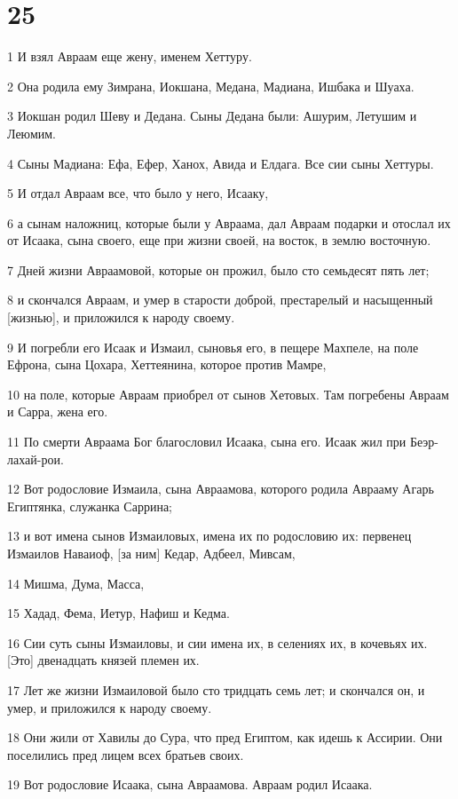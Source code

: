 \chapter{25}

\par 1 И взял Авраам еще жену, именем Хеттуру.
\par 2 Она родила ему Зимрана, Иокшана, Медана, Мадиана, Ишбака и Шуаха.
\par 3 Иокшан родил Шеву и Дедана. Сыны Дедана были: Ашурим, Летушим и Леюмим.
\par 4 Сыны Мадиана: Ефа, Ефер, Ханох, Авида и Елдага. Все сии сыны Хеттуры.
\par 5 И отдал Авраам все, что было у него, Исааку,
\par 6 а сынам наложниц, которые были у Авраама, дал Авраам подарки и отослал их от Исаака, сына своего, еще при жизни своей, на восток, в землю восточную.
\par 7 Дней жизни Авраамовой, которые он прожил, было сто семьдесят пять лет;
\par 8 и скончался Авраам, и умер в старости доброй, престарелый и насыщенный [жизнью], и приложился к народу своему.
\par 9 И погребли его Исаак и Измаил, сыновья его, в пещере Махпеле, на поле Ефрона, сына Цохара, Хеттеянина, которое против Мамре,
\par 10 на поле, которые Авраам приобрел от сынов Хетовых. Там погребены Авраам и Сарра, жена его.
\par 11 По смерти Авраама Бог благословил Исаака, сына его. Исаак жил при Беэр-лахай-рои.
\par 12 Вот родословие Измаила, сына Авраамова, которого родила Аврааму Агарь Египтянка, служанка Саррина;
\par 13 и вот имена сынов Измаиловых, имена их по родословию их: первенец Измаилов Наваиоф, [за ним] Кедар, Адбеел, Мивсам,
\par 14 Мишма, Дума, Масса,
\par 15 Хадад, Фема, Иетур, Нафиш и Кедма.
\par 16 Сии суть сыны Измаиловы, и сии имена их, в селениях их, в кочевьях их. [Это] двенадцать князей племен их.
\par 17 Лет же жизни Измаиловой было сто тридцать семь лет; и скончался он, и умер, и приложился к народу своему.
\par 18 Они жили от Хавилы до Сура, что пред Египтом, как идешь к Ассирии. Они поселились пред лицем всех братьев своих.
\par 19 Вот родословие Исаака, сына Авраамова. Авраам родил Исаака.

